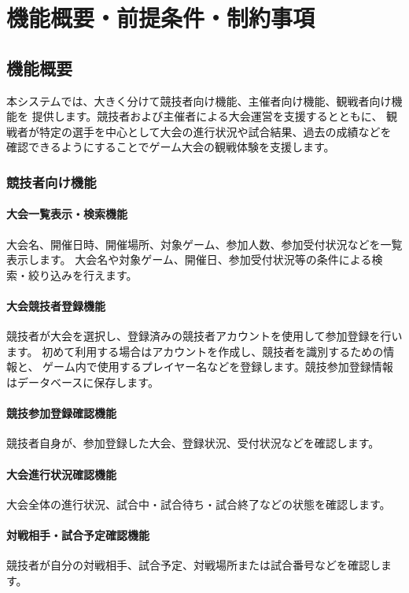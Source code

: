 
\section{機能概要・前提条件・制約事項}

\subsection{機能概要}

本システムでは、大きく分けて競技者向け機能、主催者向け機能、観戦者向け機能を
提供します。競技者および主催者による大会運営を支援するとともに、
観戦者が特定の選手を中心として大会の進行状況や試合結果、過去の成績などを
確認できるようにすることでゲーム大会の観戦体験を支援します。

\subsubsection{競技者向け機能}

\paragraph{大会一覧表示・検索機能}
大会名、開催日時、開催場所、対象ゲーム、参加人数、参加受付状況などを一覧表示します。
大会名や対象ゲーム、開催日、参加受付状況等の条件による検索・絞り込みを行えます。

\paragraph{大会競技者登録機能}
競技者が大会を選択し、登録済みの競技者アカウントを使用して参加登録を行います。
初めて利用する場合はアカウントを作成し、競技者を識別するための情報と、
ゲーム内で使用するプレイヤー名などを登録します。競技参加登録情報はデータベースに保存します。

\paragraph{競技参加登録確認機能}
競技者自身が、参加登録した大会、登録状況、受付状況などを確認します。

\paragraph{大会進行状況確認機能}
大会全体の進行状況、試合中・試合待ち・試合終了などの状態を確認します。

\paragraph{対戦相手・試合予定確認機能}
競技者が自分の対戦相手、試合予定、対戦場所または試合番号などを確認します。


